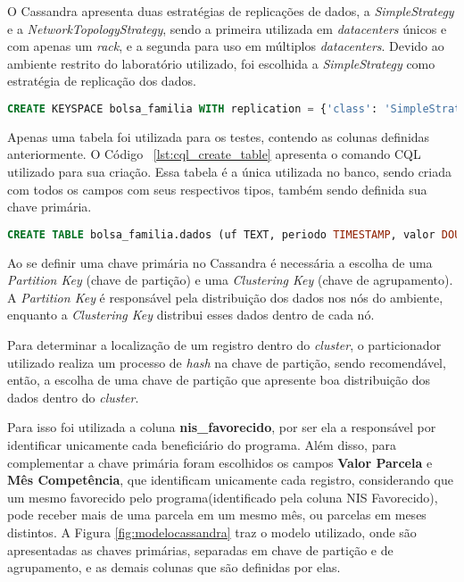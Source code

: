 O Cassandra apresenta duas estratégias de replicações de dados, a \emph{SimpleStrategy} e a \emph{NetworkTopologyStrategy}, sendo a primeira utilizada em \emph{datacenters} únicos e com apenas um \emph{rack}, e a segunda para uso em múltiplos \emph{datacenters}. Devido ao ambiente restrito do laboratório utilizado, foi escolhida a \emph{SimpleStrategy} como estratégia de replicação dos dados.

\noindent
\begin{minipage}[c]{1\textwidth}
\begin{lstlisting}[caption={Código CQL para criação do keyspace},label={lst:cql_create_keyspace},language=SQL]
CREATE KEYSPACE bolsa_familia WITH replication = {'class': 'SimpleStrategy', 'replication_factor': 1};
\end{lstlisting}
\end{minipage}

Apenas uma tabela foi utilizada para os testes, contendo as colunas definidas anteriormente. O Código ~\ref{lst:cql_create_table} apresenta o comando CQL utilizado para sua criação. Essa tabela é a única utilizada no banco, sendo criada com todos os campos com seus respectivos tipos, também sendo definida sua chave primária.

\noindent
\begin{minipage}[c]{1\textwidth}
	\begin{lstlisting}[caption={Código CQL para criação da tabela},label={lst:cql_create_table},language=SQL]
	CREATE TABLE bolsa_familia.dados (uf TEXT, periodo TIMESTAMP, valor DOUBLE, nis_favorecido BIGINT, cod_municipio INT, fonte TEXT, nome_favorecido TEXT, nome_municipio TEXT, PRIMARY KEY(nis_favorecido, periodo, valor));
	\end{lstlisting}
\end{minipage}

Ao se definir uma chave primária no Cassandra é necessária a escolha de uma \emph{Partition Key} (chave de partição) e uma \emph{Clustering Key} (chave de agrupamento). A \emph{Partition Key} é responsável pela distribuição dos dados nos nós do ambiente, enquanto a \emph{Clustering Key} distribui esses dados dentro de cada nó.

Para determinar a localização de um registro dentro do \emph{cluster}, o particionador utilizado realiza um processo de \emph{hash} na chave de partição, sendo recomendável, então, a escolha de uma chave de partição que apresente boa distribuição dos dados dentro do \emph{cluster}. 

Para isso foi utilizada a coluna \textbf{nis\_favorecido}, por ser ela a responsável por identificar unicamente cada beneficiário do programa. Além disso, para complementar a chave primária foram escolhidos os campos \textbf{Valor Parcela} e \textbf{Mês Competência}, que identificam unicamente cada registro, considerando que um mesmo favorecido pelo programa(identificado pela coluna NIS Favorecido), pode receber mais de uma parcela em um mesmo mês, ou parcelas em meses distintos. A Figura \ref{fig:modelocassandra} traz o modelo utilizado, onde são apresentadas as chaves primárias, separadas em chave de partição e de agrupamento, e as demais colunas que são definidas por elas.


